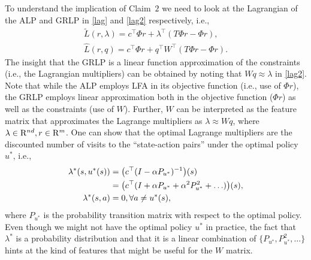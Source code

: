 To understand the implication of Claim~$2$ we need to look at the Lagrangian of the ALP and GRLP in \eqref{lag} and \eqref{lag2} respectively, i.e., 
\begin{align}\label{lag}
\tilde{L}(r,\lambda)=c^\top \Phi r+\lambda^\top (T\Phi r-\Phi r), \\ \label{lag2}\hat{L}(r,q)=c^\top \Phi r+q^\top W^\top (T\Phi r-\Phi r).
\end{align}
The insight that the GRLP is a linear function approximation of the constraints (i.e., the Lagrangian multipliers) can be obtained by noting that $ Wq\approx \lambda$ in \eqref{lag2}. Note that while the ALP employs LFA in its objective function (i.e., use of $\Phi r$), the GRLP employs linear approximation both in the objective function ($\Phi r$) as well as the constraints (use of $W$). Further, $W$ can be interpreted as the feature matrix that approximates the Lagrange multipliers as $\lambda\approx Wq$, where $\lambda \in \mathrm{R}^{nd}, r\in \mathrm{R}^m$. One can show \cite{dolgov} that the optimal Lagrange multipliers are the discounted number of visits to the ``state-action pairs'' under the optimal policy $u^*$, i.e., 
\begin{align}
\lambda^*(s,u^*(s))&=\big(c^\top(I-\alpha P_{u^*})^{-1}\big)(s)\nonumber\\
				&= \big(c^\top(I+\alpha P_{u^*}+\alpha^2 P_{u^*}^2+\ldots)\big)(s),\nonumber\\
			\lambda^*(s,a)&=0, \forall a \neq u^*(s),\nonumber
\end{align}
where $P_{u^*}$ is the probability transition matrix with respect to the optimal policy. Even though we might not have the optimal policy $u^*$ in practice, the fact that $\lambda^*$ is a probability distribution and that it is a linear combination of $\{P_{u^*},P^2_{u^*},\ldots\}$ hints at the kind of features that might be useful for the $W$ matrix.\\
